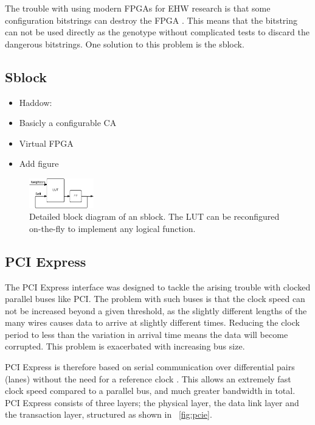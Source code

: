 The trouble with using modern FPGAs for EHW research is that some configuration bitstrings can destroy the FPGA \cite{ug380, xapp151}.
This means that the bitstring can not be used directly as the genotype without complicated tests to discard the dangerous bitstrings.
One solution to this problem is the sblock. 

\subsection{Sblock}

\begin{itemize}
    \item Haddow: \cite{haddow2000sblock}
    \item Basicly a configurable CA
    \item Virtual FPGA
    \item Add figure
\end{itemize}

\begin{figure}[!ht]
    \centering
    \includegraphics[width=0.25\textwidth]{figures/sblock}
    \caption{Detailed block diagram of an sblock. The LUT can be reconfigured on-the-fly to implement any logical function.}
    \label{fig:sblock}
\end{figure}

\subsection{PCI Express}

The PCI Express interface was designed to tackle the arising trouble with clocked parallel buses like PCI.
The problem with such buses is that the clock speed can not be increased beyond a given threshold, as the slightly different lengths of the many wires causes data to arrive at slightly different times.
Reducing the clock period to less than the variation in arrival time means the data will become corrupted.
This problem is exacerbated with increasing bus size.

PCI Express is therefore based on serial communication over differential pairs (lanes\footnotemark) without the need for a reference clock \cite{pcie}.
This allows an extremely fast clock speed compared to a parallel bus, and much greater bandwidth in total.
PCI Express consists of three layers; the physical layer, the data link layer and the transaction layer, structured as shown in \figurename~\ref{fig:pcie}.

